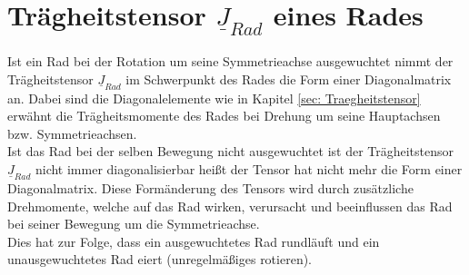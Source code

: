 

\section{Trägheitstensor $\underline{J}_{Rad}$ eines Rades}
\label{sec: Rad}

Ist ein Rad bei der Rotation um seine Symmetrieachse ausgewuchtet nimmt der Trägheitstensor $\underline{J}_{Rad}$ im Schwerpunkt des Rades die Form einer Diagonalmatrix an. Dabei sind die Diagonalelemente wie in Kapitel \ref{sec: Traegheitstensor} erwähnt die Trägheitsmomente des Rades bei Drehung um seine Hauptachsen bzw. Symmetrieachsen. \\
Ist das Rad bei der selben Bewegung nicht ausgewuchtet ist der Trägheitstensor $\underline{J}_{Rad}$ nicht immer diagonalisierbar heißt der Tensor hat nicht mehr die Form einer Diagonalmatrix. Diese Formänderung des Tensors wird durch zusätzliche Drehmomente, welche auf das Rad wirken, verursacht und beeinflussen das Rad bei seiner Bewegung um die Symmetrieachse. \\
Dies hat zur Folge, dass ein ausgewuchtetes Rad \dq rund\dq läuft und ein unausgewuchtetes Rad \dq eiert\dq{} (unregelmäßiges rotieren).